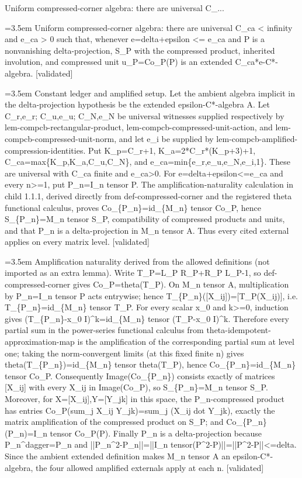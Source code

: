 \documentclass{article}
\newcommand{\step}[1]{\par\noindent\hangindent=3.5em\hangafter=1%
  \makebox[3.5em][l]{\textbf{#1.}}}
\newcommand{\steptag}[1]{\hfill{\small\textsf{[#1]}}}
\begin{document}
\begin{proofbox}{Uniform compressed-corner algebra: there are universal C\_...}
\step{1} Uniform compressed-corner algebra: there are universal C\_ca < infinity and e\_ca > 0 such that, whenever e=delta+epsilon <= e\_ca and P is a nonvanishing delta-projection, S\_P with the compressed product, inherited involution, and compressed unit u\_P=Co\_P(P) is an extended C\_ca*e-C*-algebra. \steptag{validated} \\[6pt]
\step{1.1} Constant ledger and amplified setup. Let the ambient algebra implicit in the delta-projection hypothesis be the extended epsilon-C*-algebra A. Let C\_r,e\_r; C\_u,e\_u; C\_N,e\_N be universal witnesses supplied respectively by lem-compcb-rectangular-product, lem-compcb-compressed-unit-action, and lem-compcb-compressed-unit-norm, and let e\_i be supplied by lem-compcb-amplified-compression-identities. Put K\_p=C\_r+1, K\_a=2*C\_r*(K\_p+3)+1, C\_ca=max\{K\_p,K\_a,C\_u,C\_N\}, and e\_ca=min\{e\_r,e\_u,e\_N,e\_i,1\}. These are universal with C\_ca finite and e\_ca>0. For e=delta+epsilon<=e\_ca and every n>=1, put P\_n=I\_n tensor P. The amplification-naturality calculation in child 1.1.1, derived directly from def-compressed-corner and the registered theta functional calculus, proves Co\_\{P\_n\}=id\_\{M\_n\} tensor Co\_P, hence S\_\{P\_n\}=M\_n tensor S\_P, compatibility of compressed products and units, and that P\_n is a delta-projection in M\_n tensor A. Thus every cited external applies on every matrix level. \steptag{validated} \\[6pt]
\step{1.1.1} Amplification naturality derived from the allowed definitions (not imported as an extra lemma). Write T\_P=L\_P R\_P+R\_P L\_P-1, so def-compressed-corner gives Co\_P=theta(T\_P). On M\_n tensor A, multiplication by P\_n=I\_n tensor P acts entrywise; hence T\_\{P\_n\}([X\_ij])=[T\_P(X\_ij)], i.e. T\_\{P\_n\}=id\_\{M\_n\} tensor T\_P. For every scalar x\_0 and k>=0, induction gives (T\_\{P\_n\}-x\_0 I)\textasciicircum{}k=id\_\{M\_n\} tensor (T\_P-x\_0 I)\textasciicircum{}k. Therefore every partial sum in the power-series functional calculus from theta-idempotent-approximation-map is the amplification of the corresponding partial sum at level one; taking the norm-convergent limits (at this fixed finite n) gives theta(T\_\{P\_n\})=id\_\{M\_n\} tensor theta(T\_P), hence Co\_\{P\_n\}=id\_\{M\_n\} tensor Co\_P. Consequently Image(Co\_\{P\_n\}) consists exactly of matrices [X\_ij] with every X\_ij in Image(Co\_P), so S\_\{P\_n\}=M\_n tensor S\_P. Moreover, for X=[X\_ij],Y=[Y\_jk] in this space, the P\_n-compressed product has entries Co\_P(sum\_j X\_ij Y\_jk)=sum\_j (X\_ij dot Y\_jk), exactly the matrix amplification of the compressed product on S\_P; and Co\_\{P\_n\}(P\_n)=I\_n tensor Co\_P(P). Finally P\_n is a delta-projection because P\_n\textasciicircum{}dagger=P\_n and ||P\_n\textasciicircum{}2-P\_n||=||I\_n tensor(P\textasciicircum{}2-P)||=||P\textasciicircum{}2-P||<=delta. Since the ambient extended definition makes M\_n tensor A an epsilon-C*-algebra, the four allowed amplified externals apply at each n. \steptag{validated} \\[4pt]

\end{proofbox}
\end{document}
